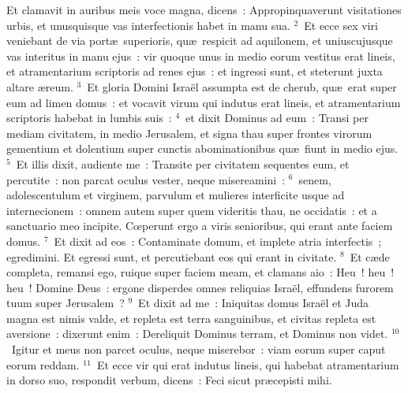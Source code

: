 \lettrine[lines=10,image=true,loversize=0.05,lraise=-0.03]{E}{}t clamavit in auribus meis voce magna, dicens~: Appropinquaverunt visitationes urbis, et unusquisque vas interfectionis habet in manu sua.
${}^{2}$~Et ecce sex viri veniebant de via port\ae\ superioris, qu\ae\ respicit ad aquilonem, et uniuscujusque vas interitus in manu ejus~: vir quoque unus in medio eorum vestitus erat lineis, et atramentarium scriptoris ad renes ejus~: et ingressi sunt, et steterunt juxta altare \ae reum.
${}^{3}$~Et gloria Domini Isra\"el assumpta est de cherub, qu\ae\ erat super eum ad limen domus~: et vocavit virum qui indutus erat lineis, et atramentarium scriptoris habebat in lumbis suis~:
${}^{4}$~et dixit Dominus ad eum~: Transi per mediam civitatem, in medio Jerusalem, et signa thau super frontes virorum gementium et dolentium super cunctis abominationibus qu\ae\ fiunt in medio ejus.
${}^{5}$~Et illis dixit, audiente me~: Transite per civitatem sequentes eum, et percutite~: non parcat oculus vester, neque misereamini~:
${}^{6}$~senem, adolescentulum et virginem, parvulum et mulieres interficite usque ad internecionem~: omnem autem super quem videritis thau, ne occidatis~: et a sanctuario meo incipite. Cœperunt ergo a viris senioribus, qui erant ante faciem domus.
${}^{7}$~Et dixit ad eos~: Contaminate domum, et implete atria interfectis~; egredimini. Et egressi sunt, et percutiebant eos qui erant in civitate.
${}^{8}$~Et c\ae de completa, remansi ego, ruique super faciem meam, et clamans aio~: Heu~! heu~! heu~! Domine Deus~: ergone disperdes omnes reliquias Isra\"el, effundens furorem tuum super Jerusalem~?
${}^{9}$~Et dixit ad me~: Iniquitas domus Isra\"el et Juda magna est nimis valde, et repleta est terra sanguinibus, et civitas repleta est aversione~: dixerunt enim~: Dereliquit Dominus terram, et Dominus non videt.
${}^{10}$~Igitur et meus non parcet oculus, neque miserebor~: viam eorum super caput eorum reddam.
${}^{11}$~Et ecce vir qui erat indutus lineis, qui habebat atramentarium in dorso suo, respondit verbum, dicens~: Feci sicut pr\ae cepisti mihi.

